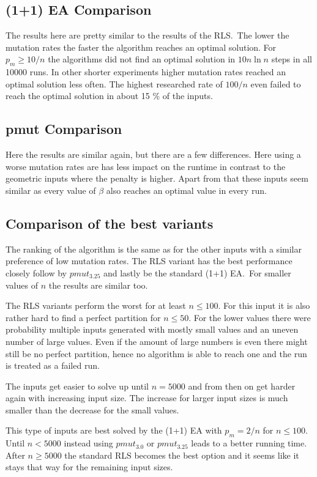 \subsection{(1+1) EA Comparison}


The results here are pretty similar to the results of the RLS.\
The lower the mutation rates the faster the algorithm reaches an optimal solution.
For $p_m\ge10/n$ the algorithms did not find an optimal solution in $10n\ln n$ steps in all 10000 runs.
In other shorter experiments higher mutation rates reached an optimal solution less often.
The highest researched rate of $100/n$ even failed to reach the optimal solution in about 15 \% of the inputs.

\subsection{pmut Comparison}


Here the results are similar again, but there are a few differences.
Here using a worse mutation rates are has less impact on the runtime in contrast to the geometric inputs where the penalty is higher.
Apart from that these inputs seem similar as every value of $\beta$ also reaches an optimal value in every run.

\subsection{Comparison of the best variants}
The ranking of the algorithm is the same as for the other inputs with a similar preference of low mutation rates.
The RLS variant has the best performance closely follow by $pmut_{3.25}$ and lastly be the standard (1+1) EA.\
For smaller values of $n$ the results are similar too.



The RLS variants perform the worst for at least $n\le 100$.
For this input it is also rather hard to find a perfect partition for $n\le50$.
For the lower values there were probability multiple inputs generated with mostly small values and an uneven number of large values.
Even if the amount of large numbers is even there might still be no perfect partition, hence no algorithm is able to reach one and the run is treated as a failed run.



The inputs get easier to solve up until $n=5000$ and from then on get harder again with increasing input size.
The increase for larger input sizes is much smaller than the decrease for the small values.



This type of inputs are best solved by the (1+1) EA with $p_m=2/n$ for $n\le100$.
Until $n<5000$ instead using $pmut_{3.0}$ or $pmut_{3.25}$ leads to a better running time.
After $n\ge5000$ the standard RLS becomes the best option and it seems like it stays that way for the remaining input sizes.
